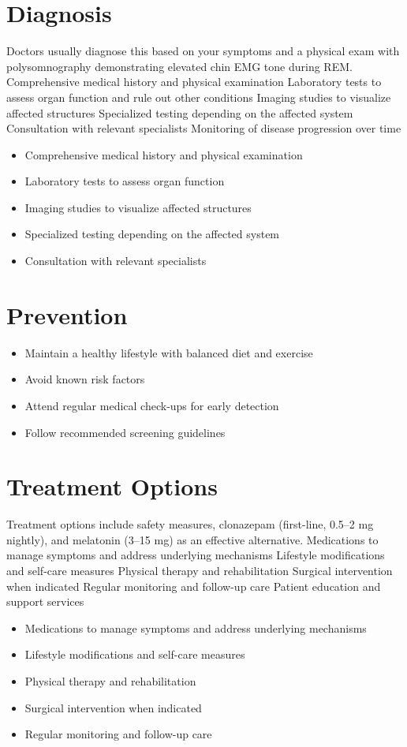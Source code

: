 \section{Diagnosis}
Doctors usually diagnose this based on your symptoms and a physical exam with polysomnography demonstrating elevated chin EMG tone during REM. Comprehensive medical history and physical examination Laboratory tests to assess organ function and rule out other conditions Imaging studies to visualize affected structures Specialized testing depending on the affected system Consultation with relevant specialists Monitoring of disease progression over time

\begin{itemize}[noitemsep]
  \item Comprehensive medical history and physical examination
  \item Laboratory tests to assess organ function
  \item Imaging studies to visualize affected structures
  \item Specialized testing depending on the affected system
  \item Consultation with relevant specialists
\end{itemize}
\section{Prevention}
\begin{itemize}[noitemsep]
  \item Maintain a healthy lifestyle with balanced diet and exercise
  \item Avoid known risk factors
  \item Attend regular medical check-ups for early detection
  \item Follow recommended screening guidelines
\end{itemize}
\section{Treatment Options}
Treatment options include safety measures, clonazepam (first-line, 0.5--2 mg nightly), and melatonin (3--15 mg) as an effective alternative. Medications to manage symptoms and address underlying mechanisms Lifestyle modifications and self-care measures Physical therapy and rehabilitation Surgical intervention when indicated Regular monitoring and follow-up care Patient education and support services

\begin{itemize}[noitemsep]
  \item Medications to manage symptoms and address underlying mechanisms
  \item Lifestyle modifications and self-care measures
  \item Physical therapy and rehabilitation
  \item Surgical intervention when indicated
  \item Regular monitoring and follow-up care
\end{itemize}
